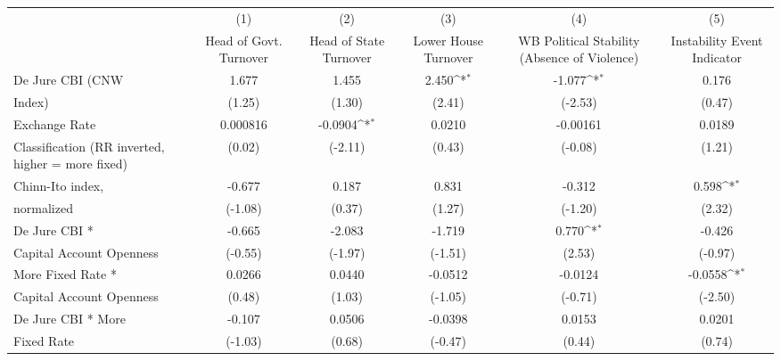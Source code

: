 {
\def\sym#1{\ifmmode^{#1}\else\(^{#1}\)\fi}
\begin{tabular}{l*{5}{c}}
\hline\hline
                    &\multicolumn{1}{c}{(1)}&\multicolumn{1}{c}{(2)}&\multicolumn{1}{c}{(3)}&\multicolumn{1}{c}{(4)}&\multicolumn{1}{c}{(5)}\\
                    &\multicolumn{1}{c}{Head of Govt. Turnover}&\multicolumn{1}{c}{Head of State Turnover}&\multicolumn{1}{c}{Lower House Turnover}&\multicolumn{1}{c}{WB Political Stability (Absence of Violence)}&\multicolumn{1}{c}{Instability Event Indicator}\\
\hline
De Jure CBI (CNW    &       1.677         &       1.455         &       2.450\sym{*}  &      -1.077\sym{*}  &       0.176         \\
Index)              &      (1.25)         &      (1.30)         &      (2.41)         &     (-2.53)         &      (0.47)         \\
[1em]
Exchange Rate       &    0.000816         &     -0.0904\sym{*}  &      0.0210         &    -0.00161         &      0.0189         \\
Classification (RR inverted, higher = more fixed)&      (0.02)         &     (-2.11)         &      (0.43)         &     (-0.08)         &      (1.21)         \\
[1em]
Chinn-Ito index,    &      -0.677         &       0.187         &       0.831         &      -0.312         &       0.598\sym{*}  \\
normalized          &     (-1.08)         &      (0.37)         &      (1.27)         &     (-1.20)         &      (2.32)         \\
[1em]
De Jure CBI *       &      -0.665         &      -2.083         &      -1.719         &       0.770\sym{*}  &      -0.426         \\
Capital Account Openness&     (-0.55)         &     (-1.97)         &     (-1.51)         &      (2.53)         &     (-0.97)         \\
[1em]
More Fixed Rate *   &      0.0266         &      0.0440         &     -0.0512         &     -0.0124         &     -0.0558\sym{*}  \\
Capital Account Openness&      (0.48)         &      (1.03)         &     (-1.05)         &     (-0.71)         &     (-2.50)         \\
[1em]
De Jure CBI * More  &      -0.107         &      0.0506         &     -0.0398         &      0.0153         &      0.0201         \\
Fixed Rate          &     (-1.03)         &      (0.68)         &     (-0.47)         &      (0.44)         &      (0.74)         \\

\end{tabular}}
